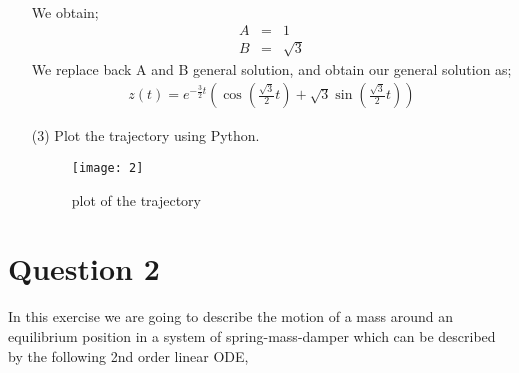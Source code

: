 \documentclass[12pt,a4paper]{article}
\begin{document}
\begin{enumerate}
\begin{eqnarray*}
\end{eqnarray*}
We obtain;
\begin{eqnarray*}
 A&=&1\\
 B&=&\sqrt{3}
\end{eqnarray*}
We replace back A and B general solution, and obtain our general solution as;
\begin{eqnarray*}
z(t)=e^{-\frac{3}{2} t}\left (\cos( \frac{\sqrt{3}}{2} t)+ \sqrt{3}\sin ( \frac{\sqrt{3}}{2} t) \right)
\end{eqnarray*}
\item[(3)]
Plot the trajectory using Python.
\begin{figure}[H]
\texttt{[image: 2]}
\centering
\caption{plot of the trajectory}
\label{fig 1}
\end{figure}
\end{enumerate}
\section*{Question 2}
In this exercise we are going to describe the motion of a mass around an equilibrium position in a system of
spring-mass-damper which can be described by the following 2nd order linear
ODE,
\end{document}
